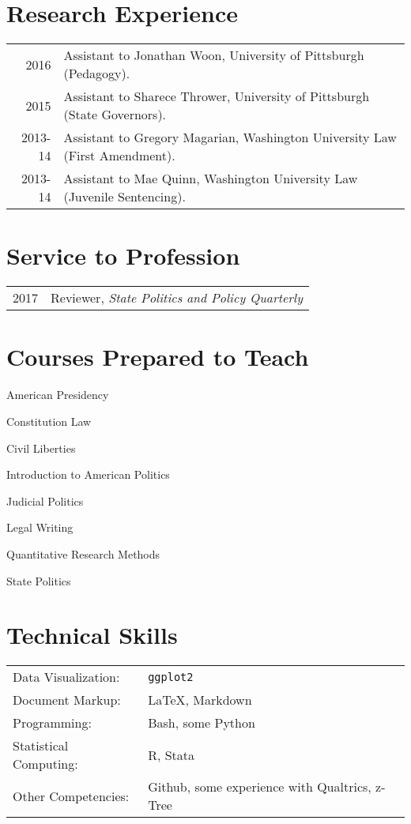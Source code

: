 \documentclass[12pt,letterpaper]{article}
\begin{document}
\section*{\sf Research Experience}
\begin{tabularx}{\textwidth}{@{}DX@{}}
  2016 & Assistant to Jonathan Woon, University of Pittsburgh (Pedagogy). \\
  2015 & Assistant to Sharece Thrower, University of Pittsburgh (State Governors). \\
  2013-14 & Assistant to Gregory Magarian, Washington University Law (First Amendment). \\
  2013-14 & Assistant to Mae Quinn, Washington University Law (Juvenile Sentencing).
\end{tabularx} \par\bigskip


\section*{\sf Service to Profession}
\begin{tabularx}{\textwidth}{@{}DX@{}}
  2017 & Reviewer, {\em State Politics and Policy Quarterly} \bigskip \\
\end{tabularx} \par\bigskip


\section*{\sf Courses Prepared to Teach}
American Presidency \par
Constitution Law\par
Civil Liberties\par
Introduction to American Politics \par
Judicial Politics \par
Legal Writing \par
Quantitative Research Methods \par
State Politics \par

\section*{\sf Technical Skills}
\begin{tabularx}{\textwidth}{@{}lX@{}}
Data Visualization: & {\tt ggplot2} \\
Document Markup: & \LaTeX, Markdown \\
Programming: & Bash, some Python \\
Statistical Computing: & R, Stata \\
Other Competencies: & Github, some experience with Qualtrics, z-Tree

\end{tabularx}
\end{document}
